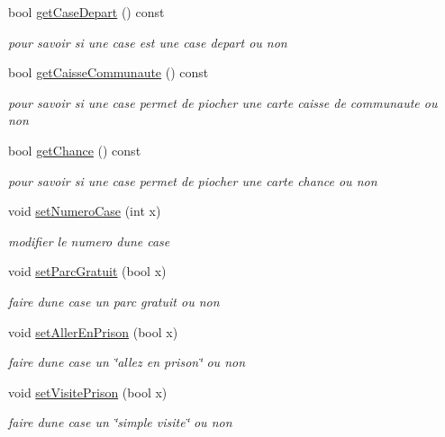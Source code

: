 \begin{DoxyCompactItemize}
bool \hyperlink{classCase_a6171b96839d47668e22f4533a2d80865}{get\+Case\+Depart} () const 
\begin{DoxyCompactList}\small\item\em pour savoir si une case est une case depart ou non \end{DoxyCompactList}\item 
bool \hyperlink{classCase_aabe2bfd6e95b2fa1bc072ae3a81484ce}{get\+Caisse\+Communaute} () const 
\begin{DoxyCompactList}\small\item\em pour savoir si une case permet de piocher une carte caisse de communaute ou non \end{DoxyCompactList}\item 
bool \hyperlink{classCase_a3b92aa372686f8fa11301bfbeee29339}{get\+Chance} () const 
\begin{DoxyCompactList}\small\item\em pour savoir si une case permet de piocher une carte chance ou non \end{DoxyCompactList}\item 
void \hyperlink{classCase_a34aa38e3569eec7807bea8ba4bada141}{set\+Numero\+Case} (int x)
\begin{DoxyCompactList}\small\item\em modifier le numero d\textquotesingle{}une case \end{DoxyCompactList}\item 
void \hyperlink{classCase_a642ea3922d7870bef55f60a84721e0e3}{set\+Parc\+Gratuit} (bool x)
\begin{DoxyCompactList}\small\item\em faire d\textquotesingle{}une case un parc gratuit ou non \end{DoxyCompactList}\item 
void \hyperlink{classCase_ab5a2876f04132597d649e5d42e00a126}{set\+Aller\+En\+Prison} (bool x)
\begin{DoxyCompactList}\small\item\em faire d\textquotesingle{}une case un \char`\"{}allez en prison\char`\"{} ou non \end{DoxyCompactList}\item 
void \hyperlink{classCase_a927af019e34de03bf2c1cab5359dea44}{set\+Visite\+Prison} (bool x)
\begin{DoxyCompactList}\small\item\em faire d\textquotesingle{}une case un \char`\"{}simple visite\char`\"{} ou non \end{DoxyCompactList}\item 

\end{DoxyCompactItemize}
